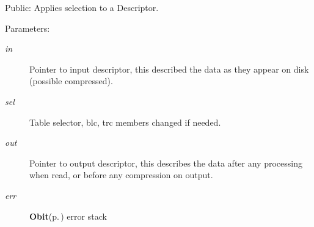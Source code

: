 Public: Applies selection to a Descriptor. 

\begin{Desc}
\item[Parameters:]
\begin{description}
\item[{\em in}]Pointer to input descriptor, this described the data as they appear on disk (possible compressed). \item[{\em sel}]Table selector, blc, trc members changed if needed. \item[{\em out}]Pointer to output descriptor, this describes the data after any processing when read, or before any compression on output. \item[{\em err}]{\bf Obit}{\rm (p.\,\pageref{structObit})} error stack \end{description}
\end{Desc}
